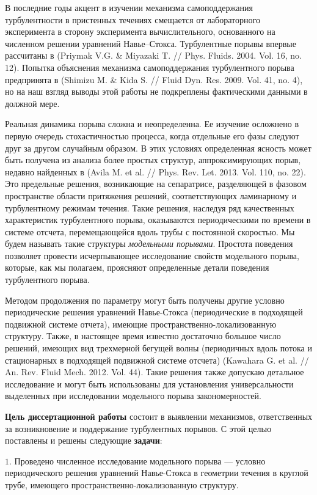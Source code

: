 В последние годы акцент в изучении механизма самоподдержания турбулентности в пристенных течениях смещается от лабораторного эксперимента в сторону эксперимента вычислительного, основанного на численном решении уравнений Навье--Стокса. Турбулентные порывы впервые рассчитаны в (Priymak V.G. \& Miyazaki T. // Phys. Fluids. 2004. Vol. 16, no. 12). Попытка объяснения механизма самоподдержания турбулентного порыва предпринята в (Shimizu M. \& Kida S. // Fluid Dyn. Res. 2009. Vol. 41, no. 4), но на наш взгляд выводы этой работы не подкреплены фактическими данными в должной мере. 

Реальная динамика порыва сложна и неопределенна. Ее изучение осложнено в первую очередь стохастичностью процесса, когда отдельные его фазы следуют друг за другом случайным образом. В этих условиях определенная ясность может быть получена из анализа более простых структур, аппроксимирующих порыв, недавно найденных в (Avila M. et al. // Phys. Rev. Let. 2013. Vol. 110, no. 22). Это предельные решения, возникающие на сепаратрисе, разделяющей в фазовом пространстве области притяжения решений, соответствующих ламинарному и турбулентному режимам течения. Такие решения, наследуя ряд качественных характеристик турбулентного порыва, оказываются периодическими по времени в системе отсчета, перемещающейся вдоль трубы с постоянной скоростью. Мы будем называть такие структуры {\it модельными порывами}. Простота поведения позволяет провести исчерпывающее исследование свойств модельного порыва, которые, как мы полагаем, проясняют определенные детали поведения турбулентного порыва. 

Методом продолжения по параметру могут быть получены другие условно периодические решения уравнений Навье-Стокса (периодические в подходящей подвижной системе отчета), имеющие пространственно-локализованную структуру. Также, в настоящее время известно достаточно большое число решений, имеющих вид трехмерной бегущей волны (периодичных вдоль потока и стационарных в подходящей подвижной системе отсчета) (Kawahara G. et al. // An. Rev. Fluid Mech. 2012. Vol. 44). Такие решения также допускаю детальное исследование и могут быть использованы для установления универсальности выделенных при исследовании модельного порыва закономерностей. 

{\bf Цель диссертационной работы} состоит в выявлении механизмов, ответственных за возникновение и поддержание турбулентных порывов. 
С этой целью поставлены и решены следующие \textbf{задачи}: 

\noindent $1.$ Проведено численное исследование модельного порыва --- условно периодического решения уравнений Навье-Стокса в геометрии течения в круглой трубе, имеющего пространственно-локализованную структуру. %

